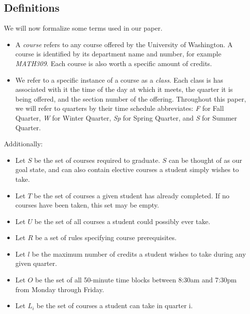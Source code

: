 \documentclass[11pt]{article} %
\begin{document}
\subsection{Definitions} We will now formalize some terms used in our paper.
\begin{itemize} \item A {\it course} refers to any course offered by the
University of Washington. A course is identified by its department name and
number, for example {\it MATH309}. Each course is also worth a specific amount
of credits. \item We refer to a specific instance of a course as a {\it class}.
Each class is has associated with it the time of the day at which it  meets, the
quarter it is being offered, and the section number of the offering.  Throughout
this paper, we will refer to quarters by their time schedule abbreviates: {\it
F} for Fall Quarter, {\it W} for Winter Quarter, {\it Sp} for Spring Quarter,
and {\it S} for Summer Quarter. \end{itemize}

Additionally: \begin{itemize} \item Let $S$ be the set of courses required to
graduate. $S$ can be thought of as our goal state, and can also contain elective
courses a student simply wishes to take.  \item Let $T$ be the set of courses
a given student has already completed. If no courses have been taken, this set
may be empty.  \item Let $U$ be the set of all courses a student could possibly
ever take.  \item Let $R$ be a set of rules specifying course prerequisites.
\item Let $l$ be the maximum number of credits a student wishes to take during
any given quarter.  \item Let $O$ be the set of all 50-minute time blocks
between 8:30am and 7:30pm from Monday through Friday. \item Let $L_i$ be the set
of courses a student can take in quarter i. \end{itemize}
\end{document}
